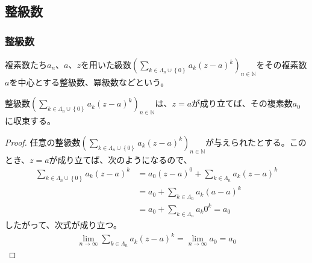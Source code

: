 \documentclass[dvipdfmx]{jsarticle}
\begin{document}
\subsection{整級数}%
\subsubsection{整級数}%
\begin{dfn}
複素数たち$a_{n}$、$a$、$z$を用いた級数$\left( \sum_{k \in \varLambda_{n} \cup \left\{ 0 \right\}} {a_{k}(z - a)^{k}} \right)_{n \in \mathbb{N}}$をその複素数$a$を中心とする整級数、冪級数などという。
\end{dfn}
\begin{thm}\label{4.1.13.1}
整級数$\left( \sum_{k \in \varLambda_{n} \cup \left\{ 0 \right\}} {a_{k}(z - a)^{k}} \right)_{n \in \mathbb{N}}$は、$z = a$が成り立てば、その複素数$a_{0}$に収束する。
\end{thm}
\begin{proof}
任意の整級数$\left( \sum_{k \in \varLambda_{n} \cup \left\{ 0 \right\}} {a_{k}(z - a)^{k}} \right)_{n \in \mathbb{N}}$が与えられたとする。このとき、$z = a$が成り立てば、次のようになるので、
\begin{align*}
\sum_{k \in \varLambda_{n} \cup \left\{ 0 \right\}} {a_{k}(z - a)^{k}} &= a_{0}(z - a)^{0} + \sum_{k \in \varLambda_{n}} {a_{k}(z - a)^{k}}\\
&= a_{0} + \sum_{k \in \varLambda_{n}} {a_{k}(a - a)^{k}}\\
&= a_{0} + \sum_{k \in \varLambda_{n}} {a_{k}0^{k}} = a_{0}
\end{align*}
したがって、次式が成り立つ。
\begin{align*}
\lim_{n \rightarrow \infty}{\sum_{k \in \varLambda_{n}} {a_{k}(z - a)^{k}}} = \lim_{n \rightarrow \infty}a_{0} = a_{0}
\end{align*}
\end{proof}
\end{document}
